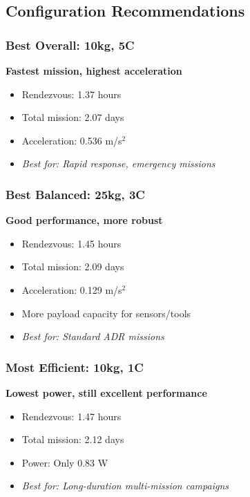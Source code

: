 \documentclass[11pt,a4paper]{article}
\begin{document}
\subsection{Configuration Recommendations}

\subsubsection{Best Overall: 10kg, 5C}
\textbf{Fastest mission, highest acceleration}
\begin{itemize}[leftmargin=*]
    \item Rendezvous: 1.37 hours
    \item Total mission: 2.07 days
    \item Acceleration: 0.536 m/s$^2$
    \item \textit{Best for: Rapid response, emergency missions}
\end{itemize}

\subsubsection{Best Balanced: 25kg, 3C}
\textbf{Good performance, more robust}
\begin{itemize}[leftmargin=*]
    \item Rendezvous: 1.45 hours
    \item Total mission: 2.09 days
    \item Acceleration: 0.129 m/s$^2$
    \item More payload capacity for sensors/tools
    \item \textit{Best for: Standard ADR missions}
\end{itemize}

\subsubsection{Most Efficient: 10kg, 1C}
\textbf{Lowest power, still excellent performance}
\begin{itemize}[leftmargin=*]
    \item Rendezvous: 1.47 hours
    \item Total mission: 2.12 days
    \item Power: Only 0.83 W
    \item \textit{Best for: Long-duration multi-mission campaigns}
\end{itemize}

\end{document}
